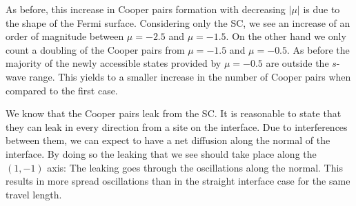 \documentclass[..\main.tex]{subfile}
\begin{document}
As before, this increase in Cooper pairs formation with decreasing $|\mu|$ is due to the shape of the Fermi surface.
Considering only the SC, we see an increase of an order of magnitude between $\mu=-2.5$ and $\mu=-1.5$. On the other hand we only count
a doubling of the Cooper pairs from $\mu=-1.5$ and $\mu=-0.5$.
As before the majority of the newly accessible states provided by $\mu=-0.5$ are outside the $s$-wave range.
This yields to a smaller increase in the number of Cooper pairs when compared to the first case.


We know that the Cooper pairs leak from the SC. It is reasonable to state that they can leak in every direction from a site on the interface.
Due to interferences between them, we can expect to have a net diffusion along the normal of the interface. By doing so the leaking that we see
should take place along the $(1,-1)$ axis: The leaking goes through the oscillations along the normal. This results in more spread
oscillations than in the straight interface case for the same travel length.
\end{document}
